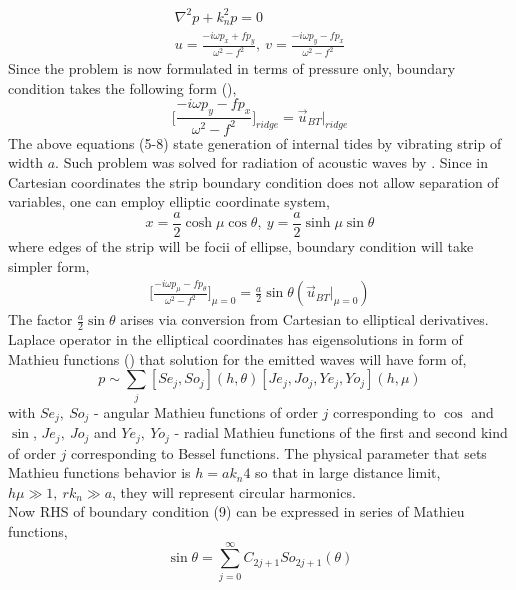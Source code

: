 \begin{align}
\nabla^2 p + k_n^2 p = 0\\
u = \frac{-i \omega p_x + f p_y}{\omega^2 - f^2},~v = \frac{-i \omega p_y - f p_x}{\omega^2 - f^2}
\end{align}
Since the problem is now formulated in terms of pressure only, boundary condition takes the following form (\cite{greenspan1968theory}),
\begin{equation}
\Big[ \frac{-i \omega p_y - f p_x}{\omega^2 - f^2} \Big]_{ridge} = \vec{u}_{BT}|_{ridge}
\end{equation}
The above equations (5-8) state generation of internal tides by vibrating strip of width $a$. Such problem was solved for radiation of acoustic waves by \cite{morse1946methods}. Since in Cartesian coordinates the strip boundary condition does not allow separation of variables, one can employ elliptic coordinate system,
\begin{equation*}
x = \frac{a}{2} \cosh \mu \cos \theta,~y = \frac{a}{2} \sinh \mu \sin \theta
\end{equation*}
where edges of the strip will be focii of ellipse, boundary condition will take simpler form,
\begin{align}
\Big[ \frac{-i \omega p_{\mu} - f p_{\theta}}{\omega^2 - f^2} \Big]_{\mu = 0} = \frac{a}{2} \sin \theta (\vec{u}_{BT}|_{\mu = 0})
\end{align}
The factor $\frac{a}{2} \sin \theta$ arises via conversion from Cartesian to elliptical derivatives. Laplace operator in the elliptical coordinates has eigensolutions in form of Mathieu functions (\cite{stratton2007electromagnetic}) that solution for the emitted waves will have form of,
\begin{equation}
p \sim \sum_{j} [Se_j, So_j](h, \theta) [Je_j, Jo_j, Ye_j, Yo_j](h, \mu)
\end{equation}
with $Se_j,~So_j$ - angular Mathieu functions of order $j$ corresponding to $\cos$ and $\sin$, $Je_j,~Jo_j$ and $Ye_j,~Yo_j$ - radial Mathieu functions of the first and second kind of order $j$ corresponding to Bessel functions. The physical parameter that sets Mathieu functions behavior is $h = {a k_n}{4} $ so that in large distance limit, $h \mu \gg 1,~rk_n \gg a$, they will represent circular harmonics.\\
Now RHS of boundary condition (9) can be expressed in series of Mathieu functions,
\begin{equation}
\sin \theta = \sum_{j = 0}^{\infty} C_{2j + 1} So_{2j + 1} (\theta)
\end{equation}
